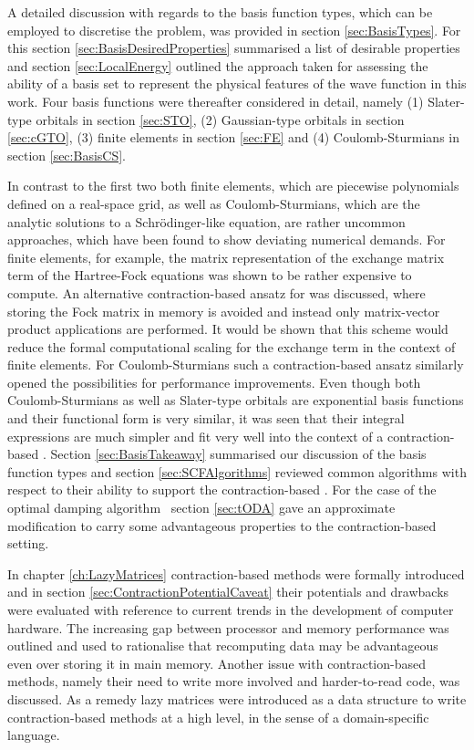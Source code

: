 
A detailed discussion with regards to the basis function types,
which can be employed to discretise the \HF problem,
was provided in section \ref{sec:BasisTypes}.
For this section \ref{sec:BasisDesiredProperties}
summarised a list of desirable properties
and section \ref{sec:LocalEnergy}
outlined the approach taken for
assessing the ability of a basis set to represent the physical
features of the wave function in this work.
Four basis functions were thereafter considered in detail,
namely (1) Slater-type orbitals in section \ref{sec:STO},
(2) Gaussian-type orbitals in section \ref{sec:cGTO},
(3) finite elements in section \ref{sec:FE}
and (4) Coulomb-Sturmians in section \ref{sec:BasisCS}.

In contrast to the first two
both finite elements,
which are piecewise polynomials defined on a real-space grid,
as well as Coulomb-Sturmians,
which are the analytic solutions to a Schrödinger-like equation,
are rather uncommon approaches,
which have been found to show deviating numerical demands.
For finite elements, for example,
the matrix representation of the exchange matrix term of the Hartree-Fock equations
was shown to be rather expensive to compute.
An alternative contraction-based ansatz for \HF was discussed,
where storing the Fock matrix in memory is avoided
and instead only matrix-vector product applications are performed.
It would be shown that this scheme would reduce
the formal computational scaling
for the exchange term in the context of finite elements.
For Coulomb-Sturmians such a contraction-based \SCF
ansatz similarly opened the possibilities for performance improvements.
Even though both Coulomb-Sturmians as well as Slater-type
orbitals are exponential basis functions
and their functional form is very similar,
it was seen that their integral expressions are much simpler
and fit very well into the context of a contraction-based \SCF.
Section \ref{sec:BasisTakeaway} summarised our discussion of the basis
function types and section \ref{sec:SCFAlgorithms}
reviewed common \SCF algorithms
with respect to their ability to support the contraction-based \SCF.
For the case of the optimal damping algorithm~\cite{Cances2000a}
section \ref{sec:tODA} gave an approximate modification
to carry some advantageous
properties to the contraction-based setting.


In chapter \ref{ch:LazyMatrices} contraction-based methods
were formally introduced and in section \ref{sec:ContractionPotentialCaveat}
their potentials and drawbacks were evaluated
with reference to current trends in the development of computer hardware.
The increasing gap between processor and memory performance
was outlined and used to rationalise that recomputing data
may be advantageous even over storing it in main memory.
Another issue with contraction-based methods,
namely their need to write more involved and harder-to-read code,
was discussed.
As a remedy lazy matrices were introduced as a data structure
to write contraction-based
methods at a high level, in the sense of a domain-specific language.

